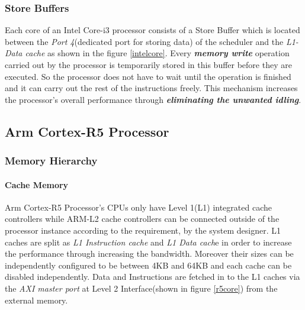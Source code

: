 \documentclass[a4paper,11pt]{article}
\begin{document}
\subsubsection{Store Buffers}

Each core of an Intel Core-i3 processor consists of a Store Buffer which is located between the \textit{Port 4}(dedicated port for storing data) of the scheduler and the \textit{L1-Data cache} as shown in the figure \ref{intelcore}. Every \textbf{\textit{memory write}} operation carried out by the processor is temporarily stored in this buffer before they are executed. So the processor does not have to wait until the operation is finished and it can carry out the rest of the instructions freely. This mechanism increases the processor's overall performance through \textit{\textbf{eliminating the unwanted idling}}. 



\subsection{Arm Cortex-R5 Processor}

\subsubsection{Memory Hierarchy}

\paragraph{Cache Memory} Arm Cortex-R5 Processor's CPUs only have Level 1(L1) integrated cache controllers while ARM-L2 cache controllers can be connected outside of the processor instance according to the requirement, by the system designer. L1 caches are split as \textit{L1 Instruction cache} and \textit{L1 Data cach}e in order to increase the performance through increasing the bandwidth. Moreover their sizes can be independently configured to be between 4KB and 64KB and each cache can be disabled independently. Data and Instructions are fetched in to the L1 caches via the \textit{AXI master port} at Level 2 Interface(shown in figure \ref{r5core}) from the external memory.\\
\end{document}
